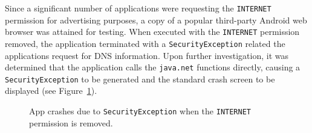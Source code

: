 Since a significant number of applications were requesting the \texttt{INTERNET} permission for advertising purposes, a copy of a popular third-party Android web browser was attained for testing.  When executed with the \texttt{INTERNET} permission removed, the application terminated with a \texttt{SecurityException} related the applications request for DNS information. Upon further investigation, it was determined that the application calls the \texttt{java.net} functions directly, causing a \texttt{SecurityException} to be generated and the standard crash screen to be displayed (see Figure~\ref{fig:crash}).


\begin{figure}[h!]
\centerline{}
\caption{App crashes due to \texttt{SecurityException} when the \texttt{INTERNET} permission is removed.}
\label{fig:crash}
\end{figure}



